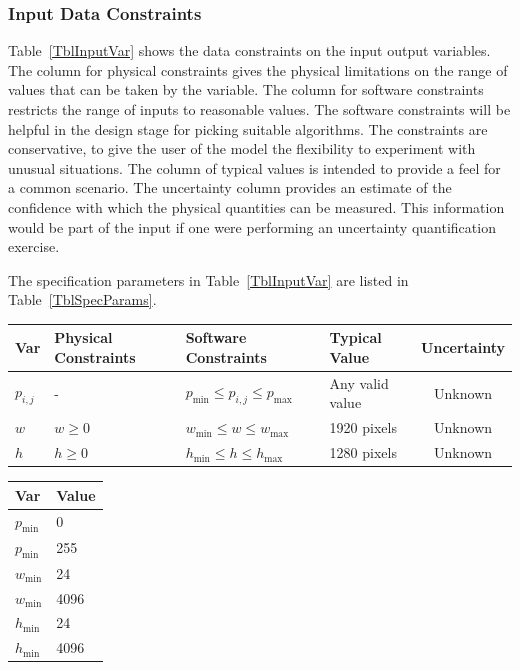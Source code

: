 \documentclass[12pt]{article}
\begin{document}
\subsubsection{Input Data Constraints} \label{sec_DataConstraints}    

Table~\ref{TblInputVar} shows the data constraints on the input output
variables.  The column for physical constraints gives the physical limitations
on the range of values that can be taken by the variable.  The column for
software constraints restricts the range of inputs to reasonable values.  The
software constraints will be helpful in the design stage for picking suitable
algorithms.  The constraints are conservative, to give the user of the model the
flexibility to experiment with unusual situations.  The column of typical values
is intended to provide a feel for a common scenario.  The uncertainty column
provides an estimate of the confidence with which the physical quantities can be
measured.  This information would be part of the input if one were performing an
uncertainty quantification exercise.

The specification parameters in Table~\ref{TblInputVar} are listed in
Table~\ref{TblSpecParams}.

\begin{table}[!h]
  \caption{Input Variables} \label{TblInputVar}
  \renewcommand{\arraystretch}{1.2}
\noindent \begin{longtable*}{l l l l c} 
  \toprule
  \textbf{Var} & \textbf{Physical Constraints} & \textbf{Software Constraints} &
                             \textbf{Typical Value} & \textbf{Uncertainty}\\
  \midrule 
  $p_{i,j}$ & - & $p_{\text{min}} \leq p_{i,j} \leq p_{\text{max}}$ & Any valid value & Unknown
  \\
  $w$ & $w\geq0$ & $w_{\text{min}} \leq w \leq w_{\text{max}}$ & 1920 pixels & Unknown
  \\
  $h$ & $h\geq0$ & $h_{\text{min}} \leq h \leq h_{\text{max}}$ & 1280 pixels & Unknown
  \\
  \bottomrule
\end{longtable*}
\end{table}

\noindent 

\begin{table}[!h]
\caption{Specification Parameter Values} \label{TblSpecParams}
\renewcommand{\arraystretch}{1.2}
\noindent \begin{longtable*}{l l} 
  \toprule
  \textbf{Var} & \textbf{Value} \\
  \midrule 
  $p_\text{min}$ & 0\\
  $p_\text{min}$ & 255\\
  $w_\text{min}$ & 24\\
  $w_\text{min}$ & 4096\\
  $h_\text{min}$ & 24\\
  $h_\text{min}$ & 4096\\
  \bottomrule
\end{longtable*}
\end{table}
\end{document}
